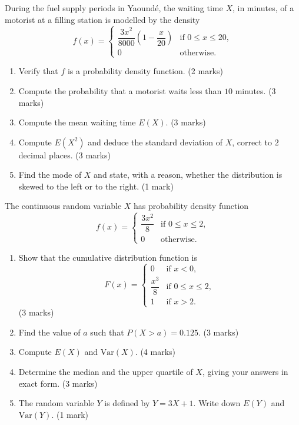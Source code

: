 \documentclass[11pt]{article}
\begin{document}
\begin{exercice}
During the fuel supply periods in Yaound\'e, the waiting time $X$, in minutes, of a motorist at a filling station is modelled by the density
\[
f(x)=\begin{cases} \dfrac{3x^2}{8000}\left(1-\dfrac{x}{20}\right) & \text{if } 0\leq x\leq 20,\\ 0 & \text{otherwise.}\end{cases}
\]
\begin{enumerate}
\item Verify that $f$ is a probability density function. \hfill(2 marks)
\item Compute the probability that a motorist waits less than $10$ minutes. \hfill(3 marks)
\item Compute the mean waiting time $E(X)$. \hfill(3 marks)
\item Compute $E(X^2)$ and deduce the standard deviation of $X$, correct to $2$ decimal places. \hfill(3 marks)
\item Find the mode of $X$ and state, with a reason, whether the distribution is skewed to the left or to the right. \hfill(1 mark)
\end{enumerate}
\end{exercice}

\begin{exercice}
The continuous random variable $X$ has probability density function
\[
f(x)=\begin{cases} \dfrac{3x^2}{8} & \text{if } 0\leq x\leq 2,\\ 0 & \text{otherwise.}\end{cases}
\]
\begin{enumerate}
\item Show that the cumulative distribution function is
\[
F(x)=\begin{cases} 0 & \text{if } x<0,\\ \dfrac{x^3}{8} & \text{if } 0\leq x\leq 2,\\ 1 & \text{if } x>2.\end{cases}
\] \hfill(3 marks)
\item Find the value of $a$ such that $P(X>a)=0.125$. \hfill(3 marks)
\item Compute $E(X)$ and $\mathrm{Var}(X)$. \hfill(4 marks)
\item Determine the median and the upper quartile of $X$, giving your answers in exact form. \hfill(3 marks)
\item The random variable $Y$ is defined by $Y=3X+1$. Write down $E(Y)$ and $\mathrm{Var}(Y)$. \hfill(1 mark)
\end{enumerate}
\end{exercice}
\end{document}
